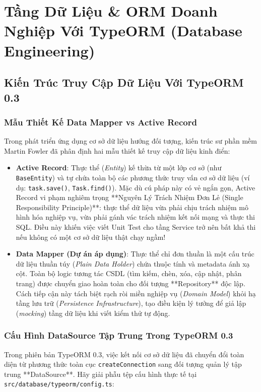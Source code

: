 \documentclass[12pt,a4paper,oneside]{book}
\begin{document}
\part{Tầng Dữ Liệu \& ORM Doanh Nghiệp Với TypeORM (Database Engineering)}

\chapter{Kiến Trúc Truy Cập Dữ Liệu Với TypeORM 0.3}

\section{Mẫu Thiết Kế Data Mapper vs Active Record}
Trong phát triển ứng dụng cơ sở dữ liệu hướng đối tượng, kiến trúc sư phần mềm Martin Fowler đã phân định hai mẫu thiết kế truy cập dữ liệu kinh điển:

\begin{itemize}
  \item \textbf{Active Record}: Thực thể (\textit{Entity}) kế thừa từ một lớp cơ sở (như \texttt{BaseEntity}) và tự chứa toàn bộ các phương thức truy vấn cơ sở dữ liệu (ví dụ: \texttt{task.save()}, \texttt{Task.find()}). Mặc dù cú pháp này có vẻ ngắn gọn, Active Record vi phạm nghiêm trọng **Nguyên Lý Trách Nhiệm Đơn Lẻ (Single Responsibility Principle)**: thực thể dữ liệu vừa phải chịu trách nhiệm mô hình hóa nghiệp vụ, vừa phải gánh vác trách nhiệm kết nối mạng và thực thi SQL. Điều này khiến việc viết Unit Test cho tầng Service trở nên bất khả thi nếu không có một cơ sở dữ liệu thật chạy ngầm!
  \item \textbf{Data Mapper (Dự án áp dụng)}: Thực thể chỉ đơn thuần là một cấu trúc dữ liệu thuần túy (\textit{Plain Data Holder}) chứa thuộc tính và metadata ánh xạ cột. Toàn bộ logic tương tác CSDL (tìm kiếm, chèn, xóa, cập nhật, phân trang) được chuyển giao hoàn toàn cho đối tượng **Repository** độc lập. Cách tiếp cận này tách biệt rạch ròi miền nghiệp vụ (\textit{Domain Model}) khỏi hạ tầng lưu trữ (\textit{Persistence Infrastructure}), tạo điều kiện lý tưởng để giả lập (\textit{mocking}) tầng dữ liệu khi viết kiểm thử tự động.
\end{itemize}

\section{Cấu Hình DataSource Tập Trung Trong TypeORM 0.3}
Trong phiên bản TypeORM 0.3, việc kết nối cơ sở dữ liệu đã chuyển đổi toàn diện từ phương thức toàn cục \texttt{createConnection} sang đối tượng quản lý tập trung **DataSource**. Hãy giải phẫu tệp cấu hình thực tế tại \texttt{src/database/typeorm/config.ts}:
\end{document}

